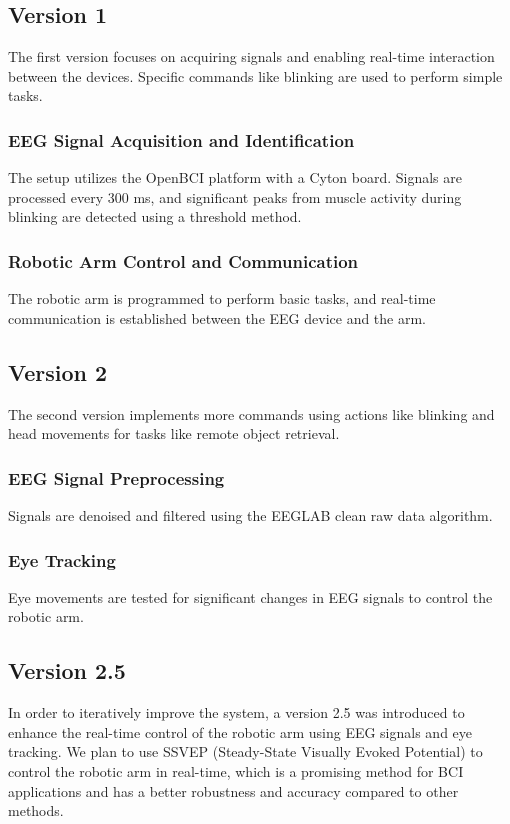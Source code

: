 \documentclass[12pt]{report}
\begin{document}
\subsection{Version 1}
The first version focuses on acquiring signals and enabling real-time interaction between the devices. Specific commands like blinking are used to perform simple tasks.

\subsubsection{EEG Signal Acquisition and Identification}
The setup utilizes the OpenBCI platform with a Cyton board. Signals are processed every 300 ms, and significant peaks from muscle activity during blinking are detected using a threshold method.

\subsubsection{Robotic Arm Control and Communication}
The robotic arm is programmed to perform basic tasks, and real-time communication is established between the EEG device and the arm.

\subsection{Version 2}
The second version implements more commands using actions like blinking and head movements for tasks like remote object retrieval.

\subsubsection{EEG Signal Preprocessing}
Signals are denoised and filtered using the EEGLAB clean raw data algorithm.

\subsubsection{Eye Tracking}
Eye movements are tested for significant changes in EEG signals to control the robotic arm.

\subsection{Version 2.5}
In order to iteratively improve the system, a version 2.5 was introduced to enhance the real-time control of the robotic arm using EEG signals and eye tracking. 
We plan to use SSVEP (Steady-State Visually Evoked Potential) to control the robotic arm in real-time, which is a promising method for BCI applications and has a better robustness and accuracy compared to other methods. 
\end{document}
